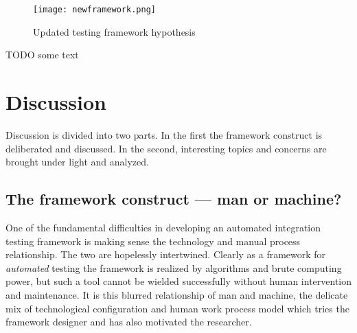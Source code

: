 \documentclass[12pt,a4paper,oneside,pdftex]{report}
\begin{document}
{\begin{figure}[H]
\centering
\texttt{[image: newframework.png]}
\caption{Updated testing framework hypothesis}
\label{fig:newframework}
\end{figure}

TODO some text



\chapter{Discussion}
\label{chapter:discussion}

Discussion is divided into two parts. In the first the framework construct is deliberated and discussed. In the second, interesting topics and concerns are brought under light and analyzed.

\begin{comment}
- the mixing of manual and technical aspects
- examples of technical, contextual needs, flexible software
- manual, involving stakeholders and getting support, maintaining the model
- the result is generalizable in parts at least (manual process part that is)

- integration testing neglected subject
- staging post or more
- component testing
- doing away with integration, testing as software grows
- responsibilities per integration, difficult to maintain otherwise, whose responsibiltiy?
- getting to the beef - a compromise

- capture replay remains debateable
\end{comment}

\section{The framework construct --- man or machine?}

One of the fundamental difficulties in developing an automated integration testing framework is making sense the technology and manual process relationship. The two are hopelessly intertwined. Clearly as a framework for \emph{automated} testing the framework is realized by algorithms and brute computing power, but such a tool cannot be wielded successfully without human intervention and maintenance. It is this blurred relationship of man and machine, the delicate mix of technological configuration and human work process model which tries the framework designer and has also motivated the researcher.

}
\end{document}
